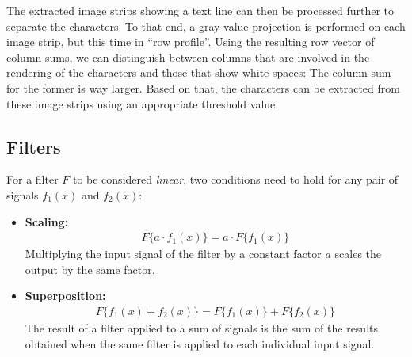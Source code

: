 \documentclass[a4paper,twocolumn]{article}
\begin{document}
	The extracted image strips showing a text line can then be processed further to separate the characters. To that end, a gray-value projection is performed on each image strip, but this time in ``row profile''. Using the resulting row vector of column sums, we can distinguish between columns that are involved in the rendering of the characters and those that show white spaces: The column sum for the former is way larger. Based on that, the characters can be extracted from these image strips using an appropriate threshold value.
	
	\subsection{Filters}
	For a filter $F$ to be considered \textit{linear}, two conditions need to hold for any pair of signals $f_1(x)$ and $f_2(x)$:
	\begin{itemize}
		\item \textbf{Scaling:} 
		\begin{align*}
		F\{a \cdot f_1(x)\} = a \cdot F\{f_1(x)\}
		\end{align*}
		Multiplying the input signal of the filter by a constant factor $a$ scales the output by the same factor.
		\item \textbf{Superposition:}
		\begin{align*}
		F\{f_1(x) + f_2(x)\} = F\{f_1(x)\} + F\{f_2(x)\}
		\end{align*}
		The result of a filter applied to a sum of signals is the sum of the results obtained when the same filter is applied to each individual input signal.
	\end{itemize}
\end{document}
